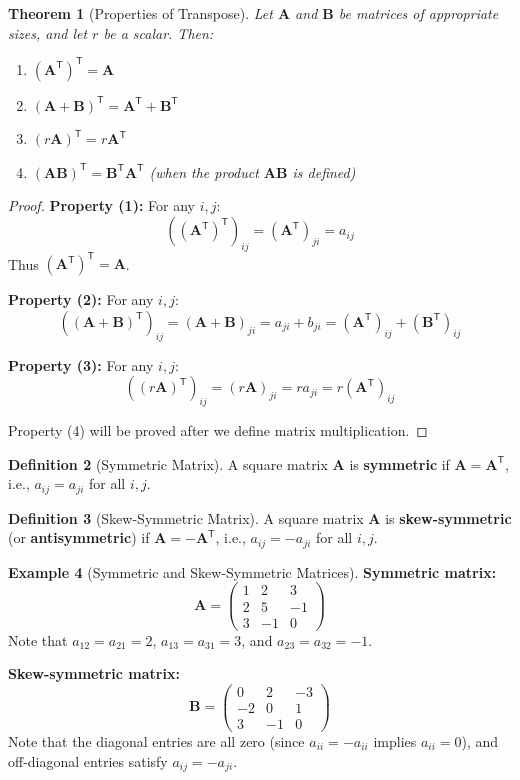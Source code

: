 \documentclass[12pt]{article}
\numberwithin{equation}{section}
\newcommand{\mat}[1]{\mathbf{#1}}        %
\newcommand{\trans}{\mathsf{T}}          %
\theoremstyle{plain}
\newtheorem{theorem}{Theorem}[section]
\theoremstyle{definition}
\newtheorem{definition}[theorem]{Definition}
\newtheorem{example}[theorem]{Example}
\theoremstyle{remark}
\begin{document}
\begin{theorem}[Properties of Transpose]
Let $\mat{A}$ and $\mat{B}$ be matrices of appropriate sizes, and let $r$ be a scalar. Then:
\begin{enumerate}
\item $(\mat{A}^{\trans})^{\trans} = \mat{A}$
\item $(\mat{A} + \mat{B})^{\trans} = \mat{A}^{\trans} + \mat{B}^{\trans}$
\item $(r\mat{A})^{\trans} = r\mat{A}^{\trans}$
\item $(\mat{A}\mat{B})^{\trans} = \mat{B}^{\trans}\mat{A}^{\trans}$ (when the product $\mat{A}\mat{B}$ is defined)
\end{enumerate}
\end{theorem}

\begin{proof}
\textbf{Property (1):} For any $i,j$:
$$((\mat{A}^{\trans})^{\trans})_{ij} = (\mat{A}^{\trans})_{ji} = a_{ij}$$
Thus $(\mat{A}^{\trans})^{\trans} = \mat{A}$.

\textbf{Property (2):} For any $i,j$:
$$((\mat{A} + \mat{B})^{\trans})_{ij} = (\mat{A} + \mat{B})_{ji} = a_{ji} + b_{ji} = (\mat{A}^{\trans})_{ij} + (\mat{B}^{\trans})_{ij}$$

\textbf{Property (3):} For any $i,j$:
$$((r\mat{A})^{\trans})_{ij} = (r\mat{A})_{ji} = ra_{ji} = r(\mat{A}^{\trans})_{ij}$$

Property (4) will be proved after we define matrix multiplication.
\end{proof}

\begin{definition}[Symmetric Matrix]
A square matrix $\mat{A}$ is \textbf{symmetric} if $\mat{A} = \mat{A}^{\trans}$, i.e., $a_{ij} = a_{ji}$ for all $i,j$.
\end{definition}

\begin{definition}[Skew-Symmetric Matrix]
A square matrix $\mat{A}$ is \textbf{skew-symmetric} (or \textbf{antisymmetric}) if $\mat{A} = -\mat{A}^{\trans}$, i.e., $a_{ij} = -a_{ji}$ for all $i,j$.
\end{definition}

\begin{example}[Symmetric and Skew-Symmetric Matrices]
\textbf{Symmetric matrix:}
$$\mat{A} = \begin{pmatrix} 1 & 2 & 3 \\ 2 & 5 & -1 \\ 3 & -1 & 0 \end{pmatrix}$$
Note that $a_{12} = a_{21} = 2$, $a_{13} = a_{31} = 3$, and $a_{23} = a_{32} = -1$.

\textbf{Skew-symmetric matrix:}
$$\mat{B} = \begin{pmatrix} 0 & 2 & -3 \\ -2 & 0 & 1 \\ 3 & -1 & 0 \end{pmatrix}$$
Note that the diagonal entries are all zero (since $a_{ii} = -a_{ii}$ implies $a_{ii} = 0$), and off-diagonal entries satisfy $a_{ij} = -a_{ji}$.
\end{example}
\end{document}
